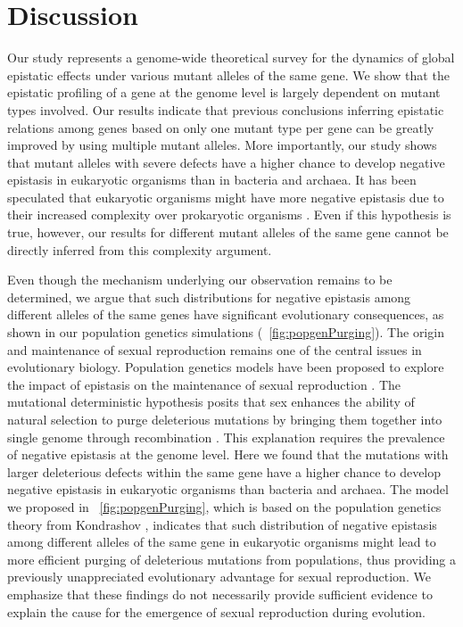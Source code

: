 \section{Discussion}
Our study represents a genome-wide theoretical survey for the dynamics
of global epistatic effects under various mutant alleles of the same
gene. We show that the epistatic profiling of a gene at the genome
level is largely dependent on mutant types involved. Our results
indicate that previous conclusions inferring epistatic relations among
genes based on only one mutant type per gene can be greatly improved
by using multiple mutant alleles. More importantly, our study shows
that mutant alleles with severe defects have a higher chance to
develop negative epistasis in eukaryotic organisms than in bacteria
and archaea. It has been speculated that eukaryotic organisms might
have more negative epistasis due to their increased complexity over
prokaryotic organisms \citep{Sanjuan2006, Sanjuan2008}. Even if this hypothesis is true,
however, our results for different mutant alleles of the same gene
cannot be directly inferred from this complexity argument.

Even though the mechanism underlying our observation remains to be
determined, we argue that such distributions for negative epistasis
among different alleles of the same genes have significant
evolutionary consequences, as shown in our population genetics
simulations (\Fig~\ref{fig:popgenPurging}). The origin and maintenance of sexual
reproduction remains one of the central issues in evolutionary
biology. Population genetics models have been proposed to explore the
impact of epistasis on the maintenance of sexual reproduction
\citep{Kondrashov1988, Otto2007, DeVisser2007, Kouyos2007}. The
mutational deterministic hypothesis posits that sex
enhances the ability of natural selection to purge deleterious
mutations by bringing them together into single genome through
recombination \citep{Kondrashov1988}. This explanation requires the prevalence of
negative epistasis at the genome level. Here we found that the
mutations with larger deleterious defects within the same gene have a
higher chance to develop negative epistasis in eukaryotic organisms
than bacteria and archaea. The model we proposed in
\Fig~\ref{fig:popgenPurging}, which is
based on the population genetics theory from Kondrashov \citep{Kondrashov1988},
indicates that such distribution of negative epistasis among different
alleles of the same gene in eukaryotic organisms might lead to more
efficient purging of deleterious mutations from populations, thus
providing a previously unappreciated evolutionary advantage for sexual
reproduction. We emphasize that these findings do not necessarily
provide sufficient evidence to explain the cause for the emergence of
sexual reproduction during evolution.

